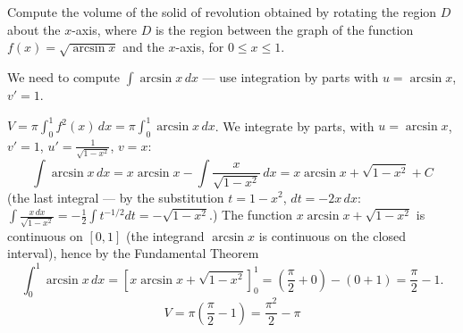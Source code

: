 
\begin{question}
Compute the volume of the solid of revolution obtained by rotating the region $D$ about the $x$-axis, where $D$ is the region between the graph of the function $f(x)=\sqrt{\arcsin x}$ and the $x$-axis, for $0\le x\le1$.
\end{question}

\begin{hint}
We need to compute $\int\arcsin x\,dx$ — use integration by parts with $u=\arcsin x$, $v'=1$.
\end{hint}

\begin{solution}
$V=\pi\int_0^1f^2(x)\,dx=\pi\int_0^1\arcsin x\,dx$. We integrate by parts, with $u=\arcsin x$, $v'=1$, $u'=\frac{1}{\sqrt{1-x^2}}$, $v=x$:
\[ \int\arcsin x\,dx=x\arcsin x-\int\frac{x}{\sqrt{1-x^2}}\,dx=x\arcsin x+\sqrt{1-x^2}+C \]
(the last integral — by the substitution $t=1-x^2$, $dt=-2x\,dx$: $\int\frac{x\,dx}{\sqrt{1-x^2}}=-\frac12\int t^{-1/2}dt=-\sqrt{1-x^2}$.) The function $x\arcsin x+\sqrt{1-x^2}$ is continuous on $[0,1]$ (the integrand $\arcsin x$ is continuous on the closed interval), hence by the Fundamental Theorem
\[ \int_0^1\arcsin x\,dx=\left[x\arcsin x+\sqrt{1-x^2}\right]_0^1=\left(\frac\pi2+0\right)-(0+1)=\frac\pi2-1. \]
\[ \boxed{V=\pi\left(\frac\pi2-1\right)=\frac{\pi^2}{2}-\pi} \]
\end{solution}
